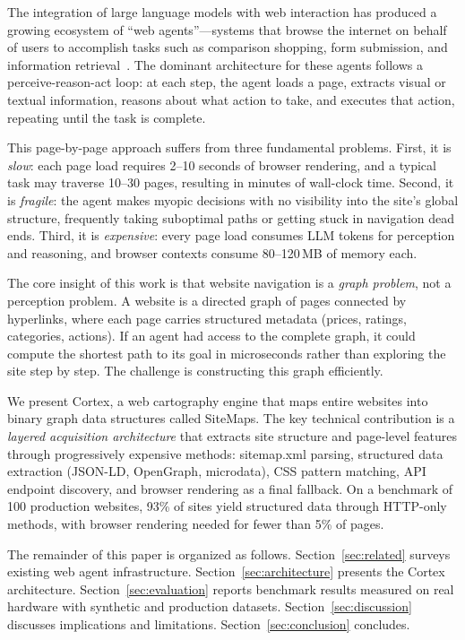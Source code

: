 \documentclass[10pt, twocolumn]{article}
\begin{document}
The integration of large language models with web interaction has produced a growing ecosystem of ``web agents''---systems that browse the internet on behalf of users to accomplish tasks such as comparison shopping, form submission, and information retrieval~\cite{park2023generative}. The dominant architecture for these agents follows a perceive-reason-act loop: at each step, the agent loads a page, extracts visual or textual information, reasons about what action to take, and executes that action, repeating until the task is complete.

This page-by-page approach suffers from three fundamental problems. First, it is \emph{slow}: each page load requires 2--10 seconds of browser rendering, and a typical task may traverse 10--30 pages, resulting in minutes of wall-clock time. Second, it is \emph{fragile}: the agent makes myopic decisions with no visibility into the site's global structure, frequently taking suboptimal paths or getting stuck in navigation dead ends. Third, it is \emph{expensive}: every page load consumes LLM tokens for perception and reasoning, and browser contexts consume 80--120\,MB of memory each.

The core insight of this work is that website navigation is a \emph{graph problem}, not a perception problem. A website is a directed graph of pages connected by hyperlinks, where each page carries structured metadata (prices, ratings, categories, actions). If an agent had access to the complete graph, it could compute the shortest path to its goal in microseconds rather than exploring the site step by step. The challenge is constructing this graph efficiently.

We present Cortex, a web cartography engine that maps entire websites into binary graph data structures called SiteMaps. The key technical contribution is a \emph{layered acquisition architecture} that extracts site structure and page-level features through progressively expensive methods: sitemap.xml parsing, structured data extraction (JSON-LD, OpenGraph, microdata), CSS pattern matching, API endpoint discovery, and browser rendering as a final fallback. On a benchmark of 100 production websites, 93\% of sites yield structured data through HTTP-only methods, with browser rendering needed for fewer than 5\% of pages.

The remainder of this paper is organized as follows. Section~\ref{sec:related} surveys existing web agent infrastructure. Section~\ref{sec:architecture} presents the Cortex architecture. Section~\ref{sec:evaluation} reports benchmark results measured on real hardware with synthetic and production datasets. Section~\ref{sec:discussion} discusses implications and limitations. Section~\ref{sec:conclusion} concludes.
\end{document}
